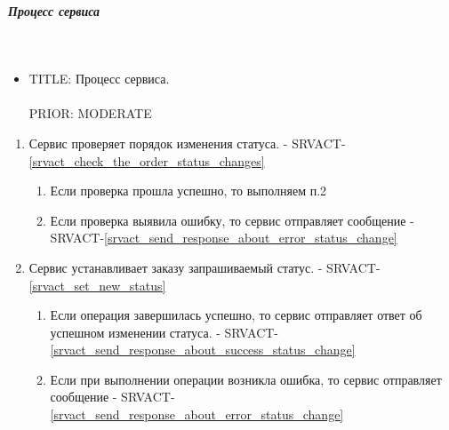    \subparagraph{Процесс сервиса} \mbox{} \\

        \begin{itemize}

             \item {
               TITLE: Процесс сервиса.\\
               \\
               PRIOR: MODERATE\\
             }

             \end{itemize}

        \begin{alg} \label{alg_order_status_processing} \mbox{}

             \begin{enumerate}

               \item Сервис проверяет порядок изменения статуса. - SRVACT-\ref{srvact_check_the_order_status_changes}

	               	\begin{enumerate}

		               	\item Если проверка прошла успешно, то выполняем п.2
	              
	               		\item Если проверка выявила ошибку, то сервис отправляет сообщение - SRVACT-\ref{srvact_send_response_about_error_status_change}

	               	\end{enumerate}

               \item Сервис устанавливает заказу запрашиваемый статус. - SRVACT-\ref{srvact_set_new_status}

	               	\begin{enumerate}

		               	\item Если операция завершилась успешно, то сервис отправляет ответ об успешном изменении статуса. - SRVACT-\ref{srvact_send_response_about_success_status_change}
	              
	               		\item Если при выполнении операции возникла ошибка, то сервис отправляет сообщение - SRVACT-\ref{srvact_send_response_about_error_status_change}

	               	\end{enumerate}

             \end{enumerate}

             \end{alg}


